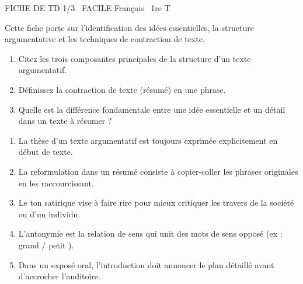\documentclass[11pt]{article}
\begin{document}
\begin{tcolorbox}[enhanced,colback=popink,colframe=popink,arc=10pt,boxrule=0pt,left=12pt,right=12pt,top=9pt,bottom=9pt]
{\color{white}\popxbold\small FICHE DE TD 1/3 \textbullet\ FACILE \hfill Français \textbullet\ 1re T\par}
\end{tcolorbox}
\vspace{4pt}
Cette fiche porte sur l'identification des idées essentielles, la structure argumentative et les techniques de contraction de texte.

\begin{exercice}
\begin{enumerate}
    \item Citez les trois composantes principales de la structure d'un texte argumentatif.
    \item Définissez la contraction de texte (résumé) en une phrase.
    \item Quelle est la différence fondamentale entre une \og idée essentielle \fg{} et un \og détail \fg{} dans un texte à résumer ?
\end{enumerate}
\end{exercice}

\begin{exercice}
\begin{enumerate}
    \item La thèse d'un texte argumentatif est toujours exprimée explicitement en début de texte.
    \item La reformulation dans un résumé consiste à copier-coller les phrases originales en les raccourcissant.
    \item Le ton satirique vise à faire rire pour mieux critiquer les travers de la société ou d'un individu.
    \item L'antonymie est la relation de sens qui unit des mots de sens opposé (ex : \og grand \fg{} / \og petit \fg{}).
    \item Dans un exposé oral, l'introduction doit annoncer le plan détaillé avant d'accrocher l'auditoire.
\end{enumerate}
\end{exercice}
\end{document}

